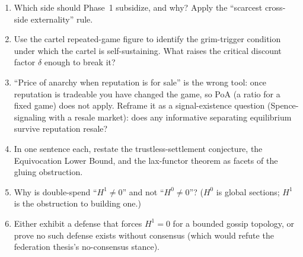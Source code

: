 \begin{enumerate}[label=\textbf{IV.\arabic*},leftmargin=2.8em,itemsep=6pt,topsep=4pt]
\item \wbcheck Which side should Phase~1 subsidize, and why? Apply the ``scarcest
  cross-side externality'' rule.

\item \wbtrace Use the cartel repeated-game figure to identify the grim-trigger
  condition under which the cartel is self-sustaining. What raises the critical
  discount factor $\delta$ enough to break it?

\item \wbopen\wbstar ``Price of anarchy when reputation is for sale'' is the wrong
  tool: once reputation is tradeable you have changed the game, so PoA (a ratio for a
  fixed game) does not apply. Reframe it as a signal-existence question
  (Spence-signaling with a resale market): does any informative separating
  equilibrium survive reputation resale?

\item \wbcheck In one sentence each, restate the trustless-settlement conjecture, the
  Equivocation Lower Bound, and the lax-functor theorem as facets of the gluing
  obstruction.

\item \wbcheck Why is double-spend ``$H^1 \ne 0$'' and not ``$H^0 \ne 0$''? ($H^0$ is
  global sections; $H^1$ is the obstruction to building one.)

\item \wbopen\wbstar Either exhibit a defense that forces $H^1 = 0$ for a bounded
  gossip topology, or prove no such defense exists without consensus (which would
  refute the federation thesis's no-consensus stance).

\end{enumerate}
